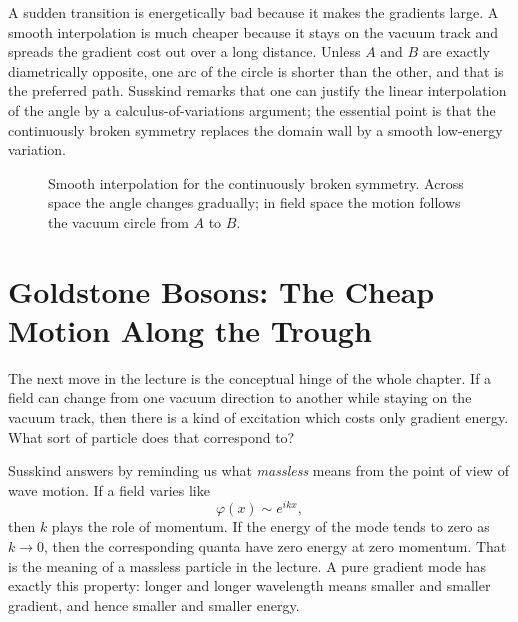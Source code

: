 A sudden transition is energetically bad because it makes the gradients large. A smooth interpolation is much cheaper because it stays on the vacuum track and spreads the gradient cost out over a long distance. Unless \(A\) and \(B\) are exactly diametrically opposite, one arc of the circle is shorter than the other, and that is the preferred path. Susskind remarks that one can justify the linear interpolation of the angle by a calculus-of-variations argument; the essential point is that the continuously broken symmetry replaces the domain wall by a smooth low-energy variation.

\begin{figure}[t]
\centering
{}
\caption{Smooth interpolation for the continuously broken symmetry. Across space the angle changes gradually; in field space the motion follows the vacuum circle from \(A\) to \(B\).}
\label{fig:lecture07-smooth-interpolation-refined}
\end{figure}

\section{Goldstone Bosons: The Cheap Motion Along the Trough}

The next move in the lecture is the conceptual hinge of the whole chapter. If a field can change from one vacuum direction to another while staying on the vacuum track, then there is a kind of excitation which costs only gradient energy. What sort of particle does that correspond to?

Susskind answers by reminding us what \emph{massless} means from the point of view of wave motion. If a field varies like
\begin{equation}
\varphi(x)\sim e^{ikx},
\label{eq:plane-wave-refined}
\end{equation}
then \(k\) plays the role of momentum. If the energy of the mode tends to zero as \(k\to 0\), then the corresponding quanta have zero energy at zero momentum. That is the meaning of a massless particle in the lecture. A pure gradient mode has exactly this property: longer and longer wavelength means smaller and smaller gradient, and hence smaller and smaller energy.

